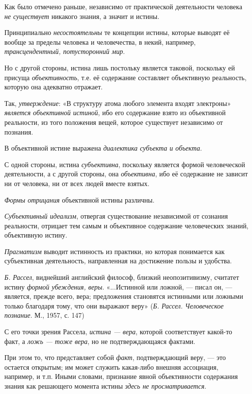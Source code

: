 \documentclass[a4paper,14pt,russian]{extreport}
\begin{document}
Как было отмечено раньше, независимо от практической деятельности человека \emph{не существует} никакого знания, а значит и истины.

Принципиально \emph{несостоятельны} те концепции истины, которые выводят её вообще за пределы человека и человечества, в некий, например, \emph{трансцендентный, потусторонний мир}.

Но с другой стороны, истина лишь постольку является таковой, поскольку ей присуща \emph{объективность}, т.е. её содержание составляет объективную реальность, которую она адекватно отражает.

Так, \emph{утверждение}: «В структуру атома любого элемента входят электроны» \emph{является объективной истиной}, ибо его содержание взято из объективной реальности, из того положения вещей, которое существует независимо от познания.

В объективной истине выражена \emph{диалектика субъекта и объекта}.

С одной стороны, истина \emph{субъективна}, поскольку является формой человеческой деятельности, а с другой стороны, она \emph{объективна}, ибо её содержание не зависит ни от человека, ни от всех людей вместе взятых.

\emph{Формы отрицания} объективной истины различны.

\emph{Субъективный идеализм}, отвергая существование независимой от сознания реальности, отрицает тем самым и объективное содержание человеческих знаний, объективную истину.

\emph{Прагматизм} выводит истинность из практики, но которая понимается как субъективная деятельность, направленная на достижение пользы и удобства.

\emph{Б. Рассел}, виднейший английский философ, близкий неопозитивизму, считатет истину \emph{формой убеждения, веры}. «...Истинной или ложной, --- писал он, --- является, прежде всего, вера; предложения становятся истинными или ложными только благодаря тому, что они выражают веру» (\emph{Б. Рассел. Человеческое познание}. М., 1957, с. 147)

С его точки зрения Рассела, \emph{истина --- вера}, которой соответствует какой-то факт, а \emph{ложь --- тоже вера}, но не подтверждающаяся фактами.

При этом то, что представляет собой \emph{факт}, подтверждающий веру, --- это остается открытым; им может служить какая-либо внешняя ассоциация, например, и т.п. Иными словами, признание явной объективности содержания знания как решающего момента истины \emph{здесь не просматривается}.
\end{document}
